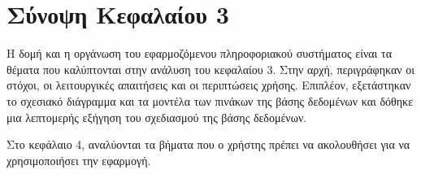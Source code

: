 \FloatBarrier

\FloatBarrier

\section{Σύνοψη Κεφαλαίου 3}
Η δομή και η οργάνωση του εφαρμοζόμενου πληροφοριακού συστήματος είναι τα θέματα που καλύπτονται στην ανάλυση του κεφαλαίου 3. Στην αρχή, περιγράφηκαν οι στόχοι, οι λειτουργικές απαιτήσεις και οι περιπτώσεις χρήσης. Επιπλέον, εξετάστηκαν το σχεσιακό διάγραμμα και τα μοντέλα των πινάκων της βάσης δεδομένων και δόθηκε μια λεπτομερής εξήγηση του σχεδιασμού της βάσης δεδομένων.

Στο κεφάλαιο 4, αναλύονται τα βήματα που ο χρήστης πρέπει να ακολουθήσει για να χρησιμοποιήσει την εφαρμογή.
